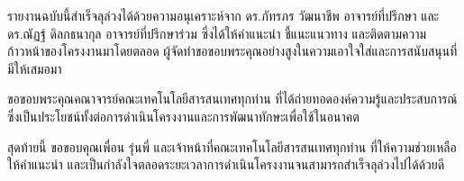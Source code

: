 \hspace{1cm}รายงานฉบับนี้สำเร็จลุล่วงได้ด้วยความอนุเคราะห์จาก ดร.ภัทรภร วัฒนาชีพ อาจารย์ที่ปรึกษา และ ดร.ณัฏฐ์ ดิลกธนากุล อาจารย์ที่ปรึกษาร่วม ซึ่งได้ให้คำแนะนำ ชี้แนะแนวทาง และติดตามความก้าวหน้าของโครงงานมาโดยตลอด ผู้จัดทำขอขอบพระคุณอย่างสูงในความเอาใจใส่และการสนับสนุนที่มีให้เสมอมา

\hspace{1cm}ขอขอบพระคุณคณาจารย์คณะเทคโนโลยีสารสนเทศทุกท่าน ที่ได้ถ่ายทอดองค์ความรู้และประสบการณ์ ซึ่งเป็นประโยชน์ทั้งต่อการดำเนินโครงงานและการพัฒนาทักษะเพื่อใช้ในอนาคต

\hspace{1cm}สุดท้ายนี้ ขอขอบคุณเพื่อน รุ่นพี่ และเจ้าหน้าที่คณะเทคโนโลยีสารสนเทศทุกท่าน ที่ให้ความช่วยเหลือ ให้คำแนะนำ และเป็นกำลังใจตลอดระยะเวลาการดำเนินโครงงานจนสามารถสำเร็จลุล่วงไปได้ด้วยดี

